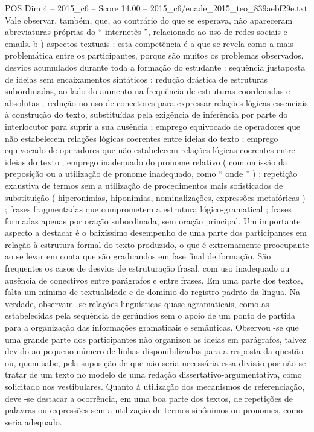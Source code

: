 \begin{textsample}{POS Dim 4 – 2015\_c6 – Score 14.00 – 2015\_c6/enade\_2015\_teo\_839aebf29e.txt}
Vale observar, também, que, ao contrário do que se esperava, não apareceram abreviaturas próprias do “ internetês ”, relacionado ao uso de redes sociais e emails. b ) aspectos textuais : esta competência é a que se revela como a mais problemática entre os participantes, porque são muitos os problemas observados, desvios acumulados durante toda a formação do estudante : sequência justaposta de ideias sem encaixamentos sintáticos ; redução drástica de estruturas subordinadas, ao lado do aumento na frequência de estruturas coordenadas e absolutas ; redução no uso de conectores para expressar relações lógicas essenciais à construção do texto, substituídas pela exigência de inferência por parte do interlocutor para suprir a sua ausência ; emprego equivocado de operadores que não estabelecem relações lógicas coerentes entre ideias do texto ; emprego equivocado de operadores que não estabelecem relações lógicas coerentes entre ideias do texto ; emprego inadequado do pronome relativo ( com omissão da preposição ou a utilização de pronome inadequado, como “ onde ” ) ; repetição exaustiva de termos sem a utilização de procedimentos mais sofisticados de substituição ( hiperonímias, hiponímias, nominalizações, expressões metafóricas ) ; frases fragmentadas que comprometem a estrutura lógico-gramatical ; frases formadas apenas por oração subordinada, sem oração principal.
Um importante aspecto a destacar é o baixíssimo desempenho de uma parte dos participantes em relação à estrutura formal do texto produzido, o que é extremamente preocupante ao se levar em conta que são graduandos em fase final de formação.
São frequentes os casos de desvios de estruturação frasal, com uso inadequado ou ausência de conectivos entre parágrafos e entre frases.
Em uma parte dos textos, falta um mínimo de textualidade e de domínio do registro padrão da língua.
Na verdade, observam -se relações linguísticas quase agramaticais, como as estabelecidas pela sequência de gerúndios sem o apoio de um ponto de partida para a organização das informações gramaticais e semânticas.
Observou -se que uma grande parte dos participantes não organizou as ideias em parágrafos, talvez devido ao pequeno número de linhas disponibilizadas para a resposta da questão ou, quem sabe, pela suposição de que não seria necessária essa divisão por não se tratar de um texto no modelo de uma redação dissertativo-argumentativa, como solicitado nos vestibulares.
Quanto à utilização dos mecanismos de referenciação, deve -se destacar a ocorrência, em uma boa parte dos textos, de repetições de palavras ou expressões sem a utilização de termos sinônimos ou pronomes, como seria adequado.

\end{textsample}
